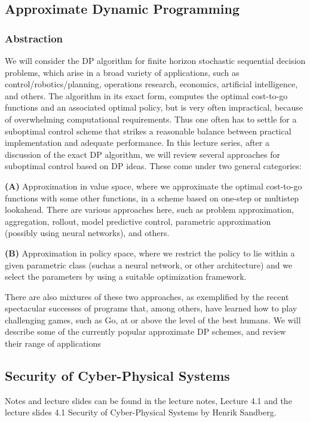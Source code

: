 \documentclass[9pt, english, a4paper]{article}
\theoremstyle{definition}
\begin{document}
\subsection{Approximate Dynamic Programming }
	\subsubsection{Abstraction}
	We will consider the DP algorithm for finite horizon stochastic sequential decision problems, which arise in a broad variety of applications, such as control/robotics/planning, operations research, economics, artificial intelligence, and others. The algorithm in its exact form, computes the optimal cost-to-go functions and an associated optimal policy, but is very often impractical, because of overwhelming computational requirements. Thus one often has to settle for a suboptimal control scheme that strikes a reasonable balance between practical implementation and adequate performance. In this lecture series, after a discussion of the exact DP algorithm, we will review several approaches for suboptimal control based on DP ideas. These come under two general categories:

	\noindent \textbf{(A)} Approximation in value space, where we approximate the optimal cost-to-go functions with some other functions, in a scheme based on one-step or multistep lookahead. There are various approaches here, such as problem approximation, aggregation, rollout, model predictive control, parametric approximation (possibly using neural networks), and others.

	\noindent \textbf{(B)} Approximation in policy space, where we restrict the policy to lie within a given parametric class (suchas a neural network, or other architecture) and we select the parameters by using a suitable optimization framework.

	\noindent There are also mixtures of these two approaches, as exemplified by the recent spectacular successes of programs that, among others, have learned how to play challenging games, such as Go, at or above the level of the best humans. We will describe some of the currently popular approximate DP schemes, and review their range of applications

\subsection{Security of Cyber-Physical Systems}
	Notes and lecture slides can be found in the lecture notes, Lecture 4.1 and the lecture slides 4.1 Security of Cyber-Physical Systems by Henrik Sandberg.
\end{document}
